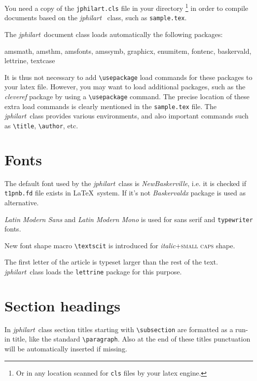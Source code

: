 \documentclass{jphilart}
\newcommand{\jphilart}{\emph{jphilart}\ } %
\begin{document}
You need a copy of the \texttt{jphilart.cls} file in your directory%
\footnote{Or in any location scanned for \texttt{cls} files by your
latex engine.} in order to compile documents based on the \jphilart
class, such as \texttt{sample.tex}.

The \jphilart document class loads automatically the following packages:
\begin{center}
  \ttfamily
  amsmath, amsthm, amsfonts, amssymb, graphicx, enumitem, fontenc,
  baskervald, lettrine, textcase
\end{center}
It is thus not necessary to add \verb+\usepackage+ load commands for
these packages to your latex file. However, you may want to load
additional packages, such as the \emph{cleveref} package by using a
\verb+\usepackage+ command. The precise location of these extra load
commands is clearly mentioned in the \texttt{sample.tex} file. The
\jphilart class provides various environments, and also important commands
such as \verb+\title+, \verb+\author+, etc.

\section{Fonts}

The default font used by the \jphilart class is \emph{NewBaskerville},
i.e. it is checked if \texttt{t1pnb.fd} file exists in \LaTeX\ system.
If it's not \emph{Baskervaldx} package is used as alternative.

\emph{Latin Modern Sans} and \emph{Latin Modern Mono} is used for
\textsf{sans serif} and \texttt{typewriter} fonts.\vfill\eject

New font shape macro \verb+\textscit+ is introduced for \emph{italic}+\textsc{small caps} shape.

The first letter of the article is typeset larger than the rest of the text.
\jphilart class loads the \texttt{lettrine} package for this purpose.

\section{Section headings}

In \jphilart class section titles starting with \verb+\subsection+ are formatted as a
run-in title, like the standard \verb+\paragraph+. Also at the end of these
titles punctuation will be automatically inserted if missing.
\end{document}
